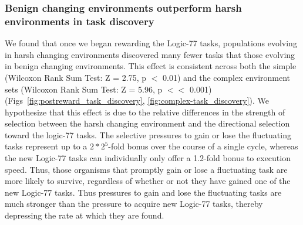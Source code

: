 \documentclass[PhD]{msu-thesis}
\begin{document}
\subsubsection{Benign changing environments outperform harsh environments in task discovery}
We found
that once we began rewarding the Logic-77 tasks, populations evolving in harsh changing environments discovered many fewer tasks that those evolving in benign changing environments. This effect is consistent across both the simple (Wilcoxon Rank Sum Test: Z = 2.75, p $<$ 0.01) and the complex environment sets (Wilcoxon Rank Sum Test: Z = 5.96, p $<<$ 0.001) (Figs~\ref{fig:postreward_task_discovery}, \ref{fig:complex-task_discovery}). We hypothesize that this effect is due to the relative differences in the strength of selection between the harsh changing environment and the directional selection toward the logic-77 tasks. 
The selective pressures to gain or lose the fluctuating tasks represent up to a $2 * 2^5$-fold bonus over the course of a single cycle, whereas the new Logic-77 tasks can individually only offer a 1.2-fold bonus to execution speed. Thus, those organisms that promptly gain or lose a fluctuating task are more likely to survive, regardless of whether or not they have gained one of the new Logic-77 tasks. Thus pressures to gain and lose the fluctuating tasks are much stronger than the pressure to acquire new Logic-77 tasks, thereby depressing the rate at which they are found.
\end{document}
